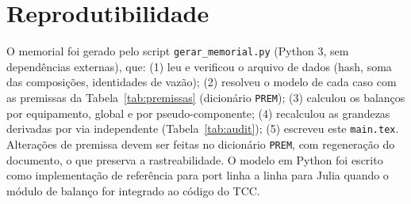 \documentclass[11pt,a4paper]{article}
\numberwithin{equation}{section}
\numberwithin{table}{section}
\numberwithin{figure}{section}
\begin{document}
\section{Reprodutibilidade}
O memorial foi gerado pelo script \texttt{gerar\_memorial.py} (Python 3, sem dependências externas), que: (1) leu e verificou o arquivo de dados (hash, soma das composições, identidades de vazão); (2) resolveu o modelo de cada caso com as premissas da Tabela~\ref{tab:premissas} (dicionário \texttt{PREM}); (3) calculou os balanços por equipamento, global e por pseudo-componente; (4) recalculou as grandezas derivadas por via independente (Tabela~\ref{tab:audit}); (5) escreveu este \texttt{main.tex}. Alterações de premissa devem ser feitas no dicionário \texttt{PREM}, com regeneração do documento, o que preserva a rastreabilidade. O modelo em Python foi escrito como implementação de referência para port linha a linha para Julia quando o módulo de balanço for integrado ao código do TCC.
\end{document}
